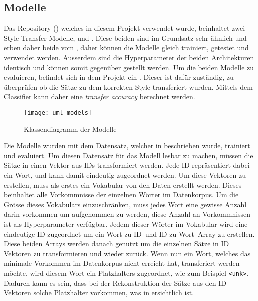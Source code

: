 \subsection{Modelle}
\label{sub:modelle}
Das Repository (\cite{cookielee77_dast}) welches in diesem Projekt verwendet wurde, beinhaltet zwei Style Transfer
Modelle,  und . Diese beiden sind im Grundsatz sehr ähnlich und erben
daher beide vom , daher können die Modelle gleich trainiert, getestet und verwendet werden.
Ausserdem sind die Hyperparameter der beiden Architekturen identisch und können somit gegenüber gestellt werden. Um die
beiden Modelle zu evaluieren, befindet sich in dem Projekt ein . Dieser ist dafür zuständig, zu
überprüfen ob die Sätze zu dem korrekten Style transferiert wurden. Mittels dem Classifier kann daher eine
\textit{transfer accuracy} berechnet werden.
\begin{figure}[H]
	\centering
	\texttt{[image: uml\_models]}
	\caption{Klassendiagramm der Modelle}
	\label{fig:uml_models}
\end{figure}
\noindent
Die Modelle wurden mit dem Datensatz, welcher in  beschrieben wurde, trainiert und
evaluiert. Um diesen Datensatz für das Modell lesbar zu machen, müssen die Sätze in einen Vektor aus IDs transformiert
werden. Jede ID repräsentiert dabei ein Wort, und kann damit eindeutig zugeordnet werden. 
\newline
\newline
Um diese Vektoren zu erstellen, muss als erstes ein Vokabular von den Daten erstellt werden. Dieses beinhaltet alle
Vorkommnisse der einzelnen Wörter im Datenkorpus. Um die Grösse dieses Vokabulars einzuschränken, muss jedes Wort eine
gewisse Anzahl darin vorkommen um aufgenommen zu werden, diese Anzahl an Vorkommnissen ist als
Hyperparameter verfügbar. 
\newline
\newline
Jedem dieser Wörter im Vokabular wird eine eindeutige ID zugeordnet um ein \flqq Wort zu ID\frqq \ und \flqq ID zu
Wort\frqq \ Array zu erstellen. Diese beiden Arrays werden danach genutzt um die einzelnen Sätze in ID Vektoren zu
transformieren und wieder zurück. Wenn nun ein Wort, welches das minimale Vorkommen im Datenkorpus nicht erreicht hat,
transferiert werden möchte, wird diesem Wort ein Platzhalters zugeordnet, wie zum Beispiel \verb|<unk>|. Dadurch kann es
sein, dass bei der Rekonstruktion der Sätze aus den ID Vektoren solche Platzhalter vorkommen, was in
 ersichtlich ist.

